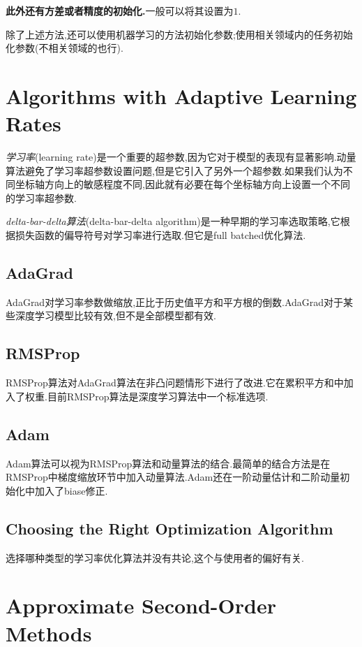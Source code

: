 \textbf{此外还有方差或者精度的初始化.}一般可以将其设置为$1$.

除了上述方法,还可以使用机器学习的方法初始化参数;使用相关领域内的任务初始化参数(不相关领域的也行).

\section{Algorithms with Adaptive Learning Rates}

\textit{学习率}(learning rate)是一个重要的超参数,因为它对于模型的表现有显著影响.动量算法避免了学习率超参数设置问题,但是它引入了另外一个超参数.如果我们认为不同坐标轴方向上的敏感程度不同,因此就有必要在每个坐标轴方向上设置一个不同的学习率超参数.

\textit{delta-bar-delta算法}(delta-bar-delta algorithm)是一种早期的学习率选取策略,它根据损失函数的偏导符号对学习率进行选取.但它是full batched优化算法.

\subsection{AdaGrad}

AdaGrad对学习率参数做缩放,正比于历史值平方和平方根的倒数.AdaGrad对于某些深度学习模型比较有效,但不是全部模型都有效.

\subsection{RMSProp}

RMSProp算法对AdaGrad算法在非凸问题情形下进行了改进.它在累积平方和中加入了权重.目前RMSProp算法是深度学习算法中一个标准选项.

\subsection{Adam}

Adam算法可以视为RMSProp算法和动量算法的结合.最简单的结合方法是在RMSProp中梯度缩放环节中加入动量算法.Adam还在一阶动量估计和二阶动量初始化中加入了biase修正.

\subsection{Choosing the Right Optimization Algorithm}

选择哪种类型的学习率优化算法并没有共论,这个与使用者的偏好有关.

\section{Approximate Second-Order Methods}

